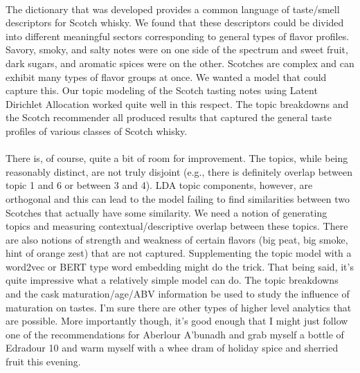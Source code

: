\documentclass{article}
\begin{document}
\paragraph{} The dictionary that was developed provides a common language of taste/smell descriptors for Scotch whisky. We found that these descriptors could be divided into different meaningful sectors corresponding to general types of flavor profiles. Savory, smoky, and salty notes were on one side of the spectrum and sweet fruit, dark sugars, and aromatic spices were on the other. Scotches are complex and can exhibit many types of flavor groups at once. We wanted a model that could capture this. Our topic modeling of the Scotch tasting notes using Latent Dirichlet Allocation worked quite well in this respect. The topic breakdowns and the Scotch recommender all produced results that captured the general taste profiles of various classes of Scotch whisky.
\paragraph{} There is, of course, quite a bit of room for improvement. The topics, while being reasonably distinct, are not truly disjoint (e.g., there is definitely overlap between topic 1 and 6 or between 3 and 4). LDA topic components, however, are orthogonal and this can lead to the model failing to find similarities between two Scotches that actually have some similarity. We need a notion of generating topics and measuring contextual/descriptive overlap between these topics. There are also notions of strength and weakness of certain flavors (big peat, big smoke, hint of orange zest) that are not captured. Supplementing the topic model with a word2vec or BERT type word embedding might do the trick. That being said, it's quite impressive what a relatively simple model can do. The topic breakdowns and the cask maturation/age/ABV information be used to study the influence of maturation on tastes. I'm sure there are other types of higher level analytics that are possible.  More importantly though, it's good enough that I might just follow one of the recommendations for Aberlour A'bunadh and grab myself a bottle of Edradour 10 and warm myself with a whee dram of holiday spice and sherried fruit this evening.
\end{document}

